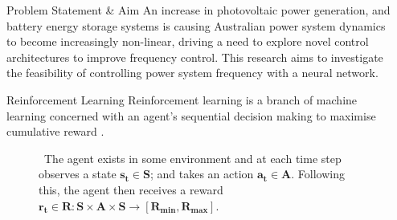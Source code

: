 \documentclass[final]{beamer}
\newlength{\sepwid}
\newlength{\onecolwid}
\begin{document}
\begin{frame}[t] %

\begin{columns}[t] %

\begin{column}{\sepwid}\end{column} %

\begin{column}{\onecolwid} %

\vspace{-1.5cm}
\begin{block}{Problem Statement \& Aim}
An increase in photovoltaic power generation, and battery energy storage systems is causing Australian power system dynamics to become increasingly non-linear, driving a need to explore novel control architectures to improve frequency control. This research aims to investigate the feasibility of controlling power system frequency with a neural network.
\end{block}


\vspace{-0.75cm}
\begin{block}{Reinforcement Learning}
Reinforcement learning is a branch of machine learning concerned with an agent's sequential decision making to maximise cumulative reward \cite{Sutton2018}.
\vspace{0.52cm}
	\begin{figure}
		
		\caption{ \ The agent exists in some environment and at each time step observes a state $\boldsymbol{s_t \in S}$; and takes an action $\boldsymbol{a_t \in A}$. Following this, the agent then receives a reward $\boldsymbol{r_t \in R: S \times A \times S \to [R_{min}, R_{max}]}$.}
	\end{figure}
\end{block}

\vspace{-0.9cm}


\end{column}
\end{columns}
\end{frame}
\end{document}
